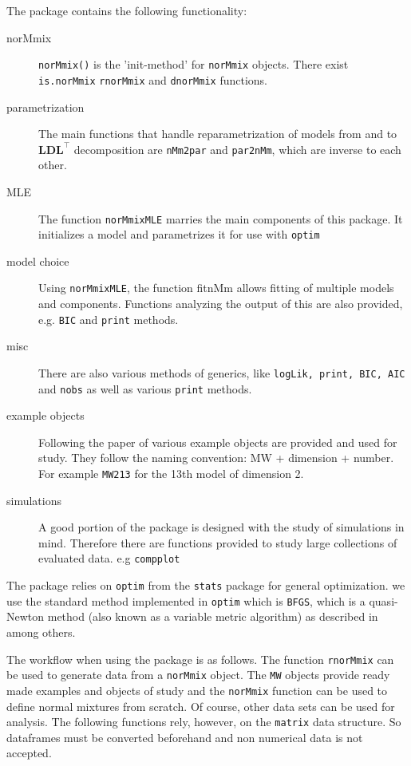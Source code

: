 The package contains the following functionality:
\begin{table}
\begin{description}
    \item [norMmix] {\tt norMmix()} is the 'init-method' for 
        {\tt norMmix} objects. There exist {\tt is.norMmix} {\tt rnorMmix} and
        {\tt dnorMmix} functions.
    \item [parametrization] The main functions that handle reparametrization
        of models from and to $\pmb{LDL}^\top$ decomposition are {\tt nMm2par}
        and {\tt par2nMm}, which are inverse to each other.
    \item [MLE] The function {\tt norMmixMLE} marries the main components of 
        this package. It initializes a model and parametrizes it for use with 
        {\tt optim}
    \item [model choice] Using {\tt norMmixMLE}, the function fitnMm allows fitting 
        of multiple models and components. Functions analyzing the output of 
        this are also provided, e.g. {\tt BIC} and {\tt print} methods.
    \item [misc] There are also various methods of generics, like {\tt logLik,
        print, BIC, AIC} and {\tt nobs} as well as various {\tt print} methods.
    \item [example objects] Following the paper of \cite{Mar92} various example
        objects are provided and used for study. They follow the naming 
        convention: MW + dimension + number. For example {\tt MW213} for the 
        13th model of dimension 2.
    \item [simulations] A good portion of the package is designed with the study 
        of simulations in mind. Therefore there are functions provided to study 
        large collections of evaluated data. e.g {\tt compplot} %
\end{description}
\end{table}


The package relies on {\tt optim} from the {\tt stats} package for general 
optimization. we use the standard method implemented in {\tt optim} which is
{\tt BFGS}, which is a quasi-Newton method (also known as a variable metric 
algorithm) as described in \cite{Bro70} among others. 

The workflow when using the package is as follows.
The function {\tt rnorMmix} can be used to generate data from a {\tt norMmix} 
object. The {\tt MW} objects provide ready made examples and objects of study
and the {\tt norMmix} function can be used to define normal mixtures from 
scratch. Of course, other data sets can be used for analysis. The following 
functions rely, however, on the {\tt matrix} data structure. So dataframes 
must be converted beforehand and non numerical data is not accepted.

